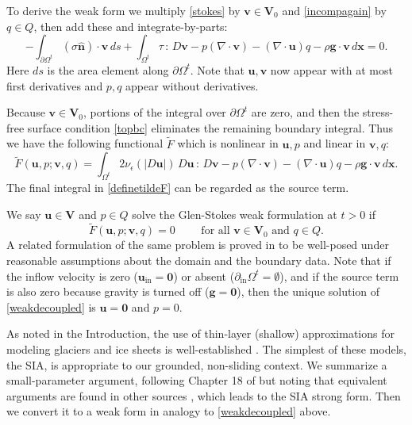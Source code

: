 \documentclass[letterpaper,final,12pt,reqno]{amsart}
\newcommand{\eps}{\epsilon}
\newcommand{\hbn}{\hat{\mathbf{n}}}
\newcommand{\bg}{\mathbf{g}}
\newcommand{\bu}{\mathbf{u}}
\newcommand{\bv}{\mathbf{v}}
\newcommand{\bx}{\mathbf{x}}
\newcommand{\bV}{\mathbf{V}}
\newcommand{\bzero}{\bm{0}}
\begin{document}
To derive the weak form we multiply \eqref{stokes} by $\bv\in \bV_0$ and \eqref{incompagain} by $q\in Q$, then add these and integrate-by-parts:
\begin{equation}
-\int_{\partial\Omega^t} (\sigma \hbn)\cdot \bv\,ds + \int_{\Omega^t} \tau \,:\,D\bv - p (\nabla \cdot \bv) - \left(\nabla \cdot \bu\right) q - \rho \mathbf{g} \cdot \bv \,d\bx = 0. \label{nonfunctwo}
\end{equation}
Here $ds$ is the area element along $\partial\Omega^t$.  Note that $\bu,\bv$ now appear with at most first derivatives and $p,q$ appear without derivatives.

Because $\bv\in \bV_0$, portions of the integral over $\partial\Omega^t$ are zero, and then the stress-free surface condition \eqref{topbc} eliminates the remaining boundary integral.  Thus we have the following functional $\tilde F$ which is nonlinear in $\bu,p$ and linear in $\bv,q$:
\begin{equation}
\tilde F(\bu,p;\bv,q) = \int_{\Omega^t} 2 \nu_\eps(|D\bu|)\, D\bu\,:\,D\bv - p (\nabla \cdot \bv) - \left(\nabla \cdot \bu\right) q - \rho \mathbf{g} \cdot \bv \,d\bx. \label{definetildeF}
\end{equation}
The final integral in \eqref{definetildeF} can be regarded as the source term.

We say $\bu\in \bV$ and $p\in Q$ solve the Glen-Stokes weak formulation at $t>0$ if
\begin{equation}
\tilde F(\bu,p;\bv,q) = 0 \qquad \text{ for all } \bv\in \bV_0 \text{ and } q\in Q.  \label{weakdecoupled}
\end{equation}
A related formulation of the same problem is proved in \cite[Theorem 3.8]{JouvetRappaz2011} to be well-posed under reasonable assumptions about the domain and the boundary data.  Note that if the inflow velocity is zero ($\bu_{\text{in}}=\bzero$) or absent ($\partial_{\text{in}} \Omega^t = \emptyset$), and if the source term is also zero because gravity is turned off ($\bg=\bzero$), then the unique solution of \eqref{weakdecoupled} is $\bu=\bzero$ and $p=0$.

As noted in the Introduction, the use of thin-layer (shallow) approximations for modeling glaciers and ice sheets is well-established \cite{SchoofHewitt2013}.  The simplest of these models, the SIA, is appropriate to our grounded, non-sliding context.  We summarize a small-parameter argument, following Chapter 18 of \cite{Fowler1997} but noting that equivalent arguments are found in other sources \cite[for example]{GreveBlatter2009}, which leads to the SIA strong form.  Then we convert it to a weak form in analogy to \eqref{weakdecoupled} above.
\end{document}
